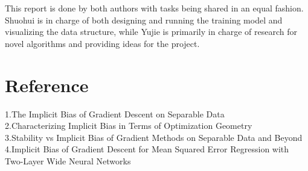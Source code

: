 This report is done by both authors with tasks being shared in an equal fashion. Shuohui is in charge of both designing and running the training model and visualizing the data structure, while Yujie is primarily in charge of research for novel algorithms and providing ideas for the project.

\chapter{Reference}

1.The Implicit Bias of Gradient Descent on Separable Data \\
2.Characterizing Implicit Bias in Terms of Optimization Geometry \\
3.Stability vs Implicit Bias of Gradient Methods on Separable Data and Beyond \\
4.Implicit Bias of Gradient Descent for Mean Squared Error Regression with Two-Layer Wide Neural Networks \\
